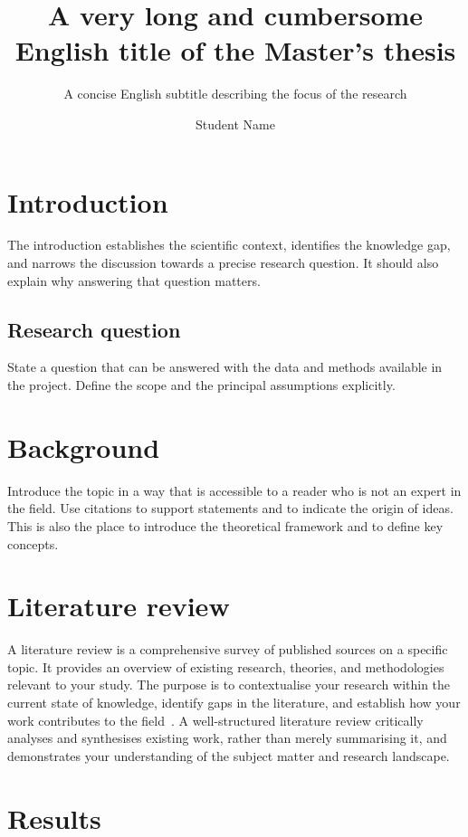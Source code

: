\documentclass[masters,en,book,11pt,departmentcolour=OUES]{OU}
\title{A very long and cumbersome English title of the Master's thesis}
\subtitle{A concise English subtitle describing the focus of the research}
\author{Student Name}
\begin{document}
\startthesis

\chapter{Introduction}

The introduction establishes the scientific context, identifies the knowledge gap, and narrows the discussion towards a precise research question.
It should also explain why answering that question matters.

\lipsum[1-12]


\section{Research question}

State a question that can be answered with the data and methods available in the project.
Define the scope and the principal assumptions explicitly.

\chapter{Background}

Introduce the topic in a way that is accessible to a reader who is not an expert in the field.
Use citations to support statements and to indicate the origin of ideas.
This is also the place to introduce the theoretical framework and to define key concepts.

\lipsum[13-28]

\chapter{Literature review}

A literature review is a comprehensive survey of published sources on a specific topic.
It provides an overview of existing research, theories, and methodologies relevant to your study.
The purpose is to contextualise your research within the current state of knowledge, identify gaps in the literature, and establish how your work contributes to the field~\cite{Beck2005timeseries}.
A well-structured literature review critically analyses and synthesises existing work, rather than merely summarising it, and demonstrates your understanding of the subject matter and research landscape.

\lipsum[29-44]

\chapter{Results}
\end{document}

